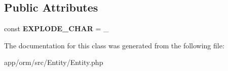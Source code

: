 \subsection*{Public Attributes}
\begin{DoxyCompactItemize}
\item 
const {\bfseries E\+X\+P\+L\+O\+D\+E\+\_\+\+C\+H\+AR} = \textquotesingle{}\+\_\+\textquotesingle{}\hypertarget{classORM_1_1Entity_1_1Entity_ad8d1be205ff51b0b7d53a08b0e717f56}{}\label{classORM_1_1Entity_1_1Entity_ad8d1be205ff51b0b7d53a08b0e717f56}

\end{DoxyCompactItemize}


The documentation for this class was generated from the following file\+:\begin{DoxyCompactItemize}
\item 
app/orm/src/\+Entity/Entity.\+php\end{DoxyCompactItemize}
